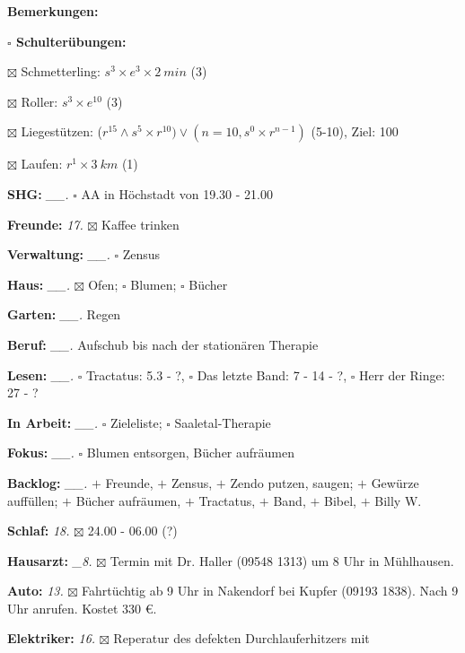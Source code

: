 \documentclass[10pt,a4paper]{article}
\newcommand\prop[1] {{\color {alizarin} {\bf #1}}}        %
\newcommand\opti[1] {{\color {amethyst} {\bf #1}}}        %
\newcommand\mand[1] {{\color {burntorange} {\bf #1}}}     %
\newcommand\bottomspace{\vskip 4pt}
\newcommand\n[1] { {\sl #1.} \hskip 5pt }
\begin{document}
\begin{mdframed}[style=daystyle]
\begin{labeling}{{\mand {Bemerkungen:}}}
\begin{minipage}{0.75\textwidth}
\begin{labeling}{\prop {$\square$ {Schulterübungen:}}}
      \item[$\boxtimes$ Schmetterling:]   $s^3 \times e^3 \times 2\ min$ (3)
      \item[$\boxtimes$ Roller:]          $s^3 \times e^{10}$ (3)
      \item[$\boxtimes$ Liegestützen:]    ($r^{15} \land s^5 \times r^{10}) \vee (n=10, s^0 \times r^{n-1})$
          (5-10), Ziel: 100
      \item[$\boxtimes$ Laufen:]          $r^1 \times 3\ km$ (1)
      \end{labeling}
    \end{minipage}
    \bottomspace        
  \item[{\mand {SHG:}}]          \n{\_\_} $\square$ AA in Höchstadt von 19.30 - 21.00
  \item[{\mand {Freunde:}}]        \n{17} $\boxtimes$ Kaffee trinken
  \item[{\mand {Verwaltung:}}]   \n{\_\_} $\square$ Zensus
  \item[{\mand {Haus:}}]         \n{\_\_} $\boxtimes$ Ofen; $\square$ Blumen; $\square$ Bücher
  \item[{\mand {Garten:}}]       \n{\_\_} Regen
  \item[{\mand {Beruf:}}]        \n{\_\_} Aufschub bis nach der stationären Therapie
  \item[{\mand {Lesen:}}]        \n{\_\_} $\square$ Tractatus: 5.3 - ?,
      $\square$ Das letzte Band: 7 - 14 - ?, $\square$ Herr der Ringe: 27 - ?
  \item[{\mand {In Arbeit:}}]    \n{\_\_} $\square$ Zieleliste; $\square$ Saaletal-Therapie
  \item[{\mand {Fokus:}}]        \n{\_\_} $\square$ Blumen entsorgen, Bücher aufräumen
  \item[{\mand {Backlog:}}]      \n{\_\_} $+$ Freunde,
    $+$ Zensus,
    $+$ Zendo putzen, saugen; $+$ Gewürze auffüllen; $+$ Bücher aufräumen,
    $+$ Tractatus, $+$ Band, $+$ Bibel, $+$ Billy W.
  \item[{\mand {Schlaf:}}]         \n{18} $\boxtimes$ 24.00 - 06.00 (?)
  \item[{\opti {Hausarzt:}}]      \n{\_8} $\boxtimes$ Termin mit Dr. Haller (09548 1313) um 8 Uhr
      in Mühlhausen.
    \item[{\opti {Auto:}}]         \n{13} $\boxtimes$ Fahrtüchtig ab 9 Uhr in Nakendorf bei
        Kupfer (09193 1838). Nach 9 Uhr anrufen. Kostet 330 \euro.
  \item[{\opti {Elektriker:}}]     \n{16} $\boxtimes$ Reperatur des defekten Durchlauferhitzers mit

\end{labeling}
\end{mdframed}
\end{document}
